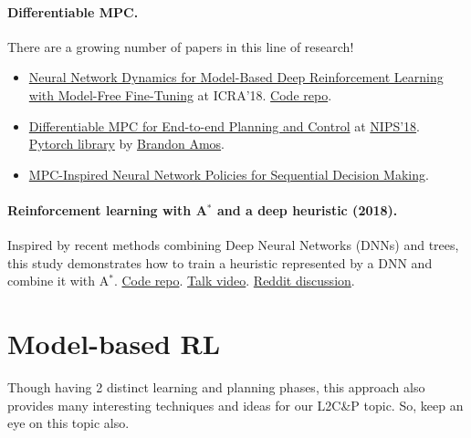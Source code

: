 \documentclass[12pt]{article}
\numberwithin{equation}{section}
\begin{document}
\paragraph{Differentiable MPC.} There are a growing number of papers in this line of research!
\begin{itemize} 
\item \href{https://www.semanticscholar.org/paper/Neural-Network-Dynamics-for-Model-Based-Deep-with-Nagabandi-Kahn/14a2d7c405e022fe2ee5b427dad9141d80353e1c}{Neural Network Dynamics for Model-Based Deep Reinforcement Learning with Model-Free Fine-Tuning} at ICRA'18. \href{https://github.com/nagaban2/nn_dynamics}{Code repo}.
\item \href{https://www.semanticscholar.org/paper/Differentiable-MPC-for-End-to-end-Planning-and-Amos-Rodr%C3%ADguez/2cd83c1dabe3d538207e9604ee5379fa78905d4d}{Differentiable MPC for End-to-end Planning and Control} at \href{https://papers.nips.cc/paper/8050-differentiable-mpc-for-end-to-end-planning-and-control}{NIPS'18}. \href{https://locuslab.github.io/mpc.pytorch/}{Pytorch library} by \href{http://bamos.github.io/}{Brandon Amos}.
%
\item \href{https://www.semanticscholar.org/paper/MPC-Inspired-Neural-Network-Policies-for-Sequential-Pereira-Fan/521915cf8238e55e400235a4624903e26a16c533}{MPC-Inspired Neural Network Policies for Sequential Decision Making}. 
\end{itemize}

\paragraph{Reinforcement learning with A$^*$ and a deep heuristic (2018).}  Inspired by recent methods combining Deep Neural Networks (DNNs) and trees, this study demonstrates how to {\color{red}train a heuristic represented by a DNN} and combine it with A$^*$. \href{https://github.com/imagry/aleph_star}{Code repo}. \href{www.youtube.com/watch?v=WSfynn8bwbI}{Talk video}. \href{https://www.reddit.com/r/MachineLearning/comments/9q667i/r_reinforcement_learning_with_a_and_a_deep/}{Reddit discussion}.


\section{Model-based RL}

Though having 2 distinct learning and planning phases, this approach also provides many interesting techniques and ideas for our L2C\&P topic. So, keep an eye on this topic also.
\end{document}
